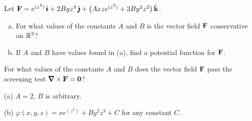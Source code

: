 \begin{question}
Let 
$\mathbf{F}= e^{(z^2)}\,\hat{\pmb{\imath}}+2Byz^3\,\hat{\pmb{\jmath}}
          +\big(Axze^{(z^2)}+3By^2z^2\big)\,\hat{\mathbf{k}}$.
\begin{enumerate}[(a)]
\item
For what values of the constants $A$ and $B$ is the
vector field $\mathbf{F}$ conservative on $\mathbb{R}^3$?
\item
If $A$ and $B$ have values found in (a),
    find a potential function for $\mathbf{F}$.
\end{enumerate}
\end{question}

\begin{hint}
For what values of the constants $A$ and $B$ does the
vector field $\mathbf{F}$ pass the screening test
$\vnabla\times\vF=\vZero$?
\end{hint}

\begin{answer}
(a)
$A=2$, $B$ is arbitrary.

(b)
$\varphi(x,y,z)=xe^{(z^2)}+By^2 z^3+C$
for any constant $C$.
\end{answer}

